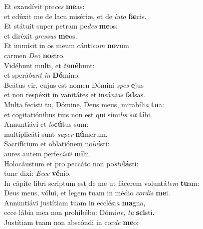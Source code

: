 \evenverse Et exaudívit pre\textit{ces} \textbf{me}as:~\*\\
\evenverse et edúxit me de lacu misériæ, et de \textit{lu}\textit{to} \textbf{fæ}cis.\\
\oddverse Et státuit super petram pe\textit{des} \textbf{me}os:~\*\\
\oddverse et diréxit \textit{gres}\textit{sus} \textbf{me}os.\\
\evenverse Et immísit in os meum cánti\textit{cum} \textbf{no}vum~\*\\
\evenverse carmen \textit{De}\textit{o} \textbf{no}stro.\\
\oddverse Vidébunt multi, et \textit{ti}\textbf{mé}bunt:~\*\\
\oddverse et sperá\textit{bunt} \textit{in} \textbf{Dó}mino.\\
\evenverse Beátus vir, cujus est nomen Dómini \textit{spes} \textbf{e}jus~\*\\
\evenverse et non respéxit in vanitátes et insá\textit{ni}\textit{as} \textbf{fal}sas.\\
\oddverse Multa fecísti tu, Dómine, Deus meus, mirabíli\textit{a} \textbf{tu}a:~\*\\
\oddverse et cogitatiónibus tuis non est qui sími\textit{lis} \textit{sit} \textbf{ti}bi.\\
\evenverse Annuntiávi et \textit{lo}\textbf{cú}tus sum:~\*\\
\evenverse multiplicáti sunt \textit{su}\textit{per} \textbf{nú}merum.\\
\oddverse Sacrifícium et oblatiónem no\textit{lu}\textbf{í}sti:~\*\\
\oddverse aures autem perfe\textit{cí}\textit{sti} \textbf{mi}hi.\\
\evenverse Holocáustum et pro peccáto non po\textit{stu}\textbf{lá}sti:~\*\\
\evenverse tunc dixi: \textit{Ec}\textit{ce} \textbf{vé}nio.\\
\oddverse In cápite libri scriptum est de me ut fácerem voluntá\textit{tem} \textbf{tu}am:~\*\\
\oddverse Deus meus, vólui, et legem tuam in médio \textit{cor}\textit{dis} \textbf{me}i.\\
\evenverse Annuntiávi justítiam tuam in ecclési\textit{a} \textbf{ma}gna,~\*\\
\evenverse ecce lábia mea non prohibébo: Dómi\textit{ne}, \textit{tu} \textbf{sci}sti.\\
\oddverse Justítiam tuam non abscóndi in cor\textit{de} \textbf{me}o:~\*\\
